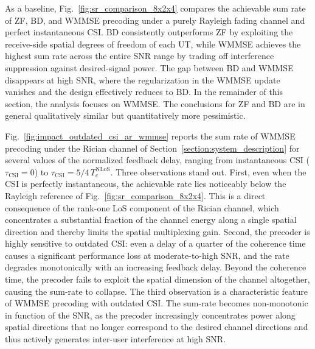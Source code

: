 \documentclass[conference]{IEEEtran}
\begin{document}
As a baseline, Fig.~\ref{fig:sr_comparison_8x2x4} compares the achievable sum rate of \ac{ZF}, \ac{BD}, and \ac{WMMSE} precoding under a purely Rayleigh fading channel and perfect instantaneous \ac{CSI}.
\ac{BD} consistently outperforms \ac{ZF} by exploiting the receive-side spatial degrees of freedom of each \ac{UT}, while \ac{WMMSE} achieves the highest sum rate across the entire \ac{SNR} range by trading off interference suppression against desired-signal power.
The gap between \ac{BD} and \ac{WMMSE} disappears at high \ac{SNR}, where the regularization in the \ac{WMMSE} update vanishes and the design effectively reduces to \ac{BD}.
In the remainder of this section, the analysis focuses on \ac{WMMSE}. The conclusions for \ac{ZF} and \ac{BD} are in general qualitatively similar but quantitatively more pessimistic.

Fig.~\ref{fig:impact_outdated_csi_ar_wmmse} reports the sum rate of \ac{WMMSE} precoding under the Rician channel of Section~\ref{section:system_description} for several values of the normalized feedback delay, ranging from instantaneous \ac{CSI} ($\tau_{\mathrm{CSI}}=0$) to $\tau_{\mathrm{CSI}} = 5/4\,T_c^{\mathrm{NLoS}}$.
Three observations stand out.
First, even when the \ac{CSI} is perfectly instantaneous, the achievable rate lies noticeably below the Rayleigh reference of Fig.~\ref{fig:sr_comparison_8x2x4}.
This is a direct consequence of the rank-one \ac{LoS} component of the Rician channel, which concentrates a substantial fraction of the channel energy along a single spatial direction and thereby limits the spatial multiplexing gain.
Second, the precoder is highly sensitive to outdated \ac{CSI}: even a delay of a quarter of the coherence time causes a significant performance loss at moderate-to-high \ac{SNR}, and the rate degrades monotonically with an increasing feedback delay.
Beyond the coherence time, the precoder fails to exploit the spatial dimension of the channel altogether, causing the sum-rate to collapse.
The third observation is a characteristic feature of \ac{WMMSE} precoding with outdated \ac{CSI}. 
The sum-rate becomes non-monotonic in function of the \ac{SNR}, as the precoder increasingly concentrates power along spatial directions that no longer correspond to the desired channel directions and thus actively generates inter-user interference at high \ac{SNR}.
\end{document}
